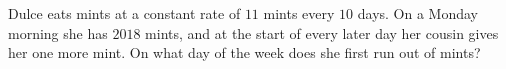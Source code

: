 Dulce eats mints at a constant rate of $11$ mints every $10$ days. On a Monday morning she has $2018$ mints, and at the start of every later day her cousin gives her one more mint. On what day of the week does she first run out of mints?
